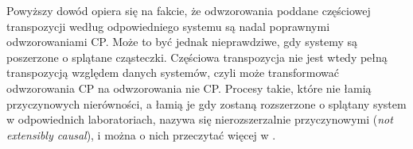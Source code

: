 \documentclass[10pt]{article} %
\newcommand{\IO}{\mathbb{1}^\circ}
\begin{document}
Powyższy dowód opiera się na fakcie, że odwzorowania poddane częściowej transpozycji według odpowiedniego systemu są nadal poprawnymi odwzorowaniami CP.
Może to być jednak nieprawdziwe, gdy systemy są poszerzone o splątane cząsteczki. Częściowa transpozycja nie jest wtedy pełną transpozycją względem danych systemów, czyli może transformować odwzorowania CP na odwzorowania nie CP. Procesy takie, które nie łamią przyczynowych nierówności, a łamią je gdy zostaną rozszerzone o splątany system w odpowiednich laboratoriach, nazywa się nierozszerzalnie przyczynowymi (\textit{not extensibly causal}),
i można o nich przeczytać więcej w \cite{causal_model}.
\end{document}
